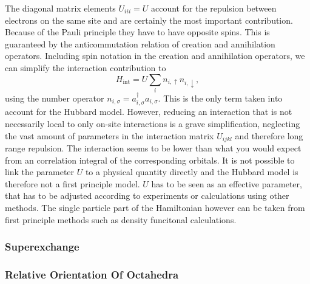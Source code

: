 \documentclass[a4paper,10pt]{report}
\begin{document}
The diagonal matrix elements $U_{iii} = U$ account for the repulsion between electrons on the same site and are certainly the most important contribution.
Because of the Pauli principle they have to have opposite spins. 
This is guaranteed by the anticommutation relation of creation and annihilation operators.
Including spin notation in the creation and annihilation operators, we can simplify the interaction contribution to 
\begin{equation}
 H_{\text{int}} = U \sum_i n_{i,\uparrow} n_{i,\downarrow},
\end{equation}
using the number operator $n_{i,\sigma} = a^{\dagger}_{i,\sigma} a_{i,\sigma}$.
This is the only term taken into account for the Hubbard model.
However, reducing an interaction that is not necessarily local to only on-site interactions is a grave simplification, 
neglecting the vast amount of parameters in the interaction matrix $U_{ijkl}$ and therefore long range repulsion.
The interaction seems to be lower than what you would expect from an correlation integral of the corresponding orbitals.
It is not possible to link the parameter $U$ to a physical quantity directly
and the Hubbard model is therefore not a first principle model. $U$ has to be seen as an effective parameter, that has to be adjusted according to experiments or calculations using
other methods.
The single particle part of the Hamiltonian however can be taken from first principle methods such as density funcitonal calculations.



\subsubsection{Superexchange}






\subsubsection{Relative Orientation Of Octahedra}

\end{document}
